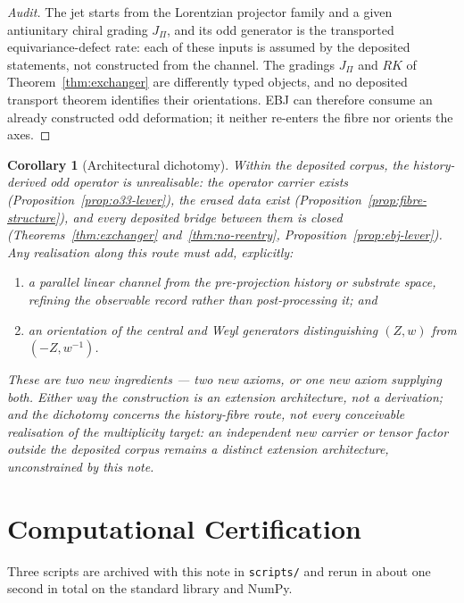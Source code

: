 \documentclass[11pt,a4paper]{article}
\newtheorem{corollary}[theorem]{Corollary}
\theoremstyle{definition}
\theoremstyle{remark}
\begin{document}
\begin{proof}[Audit]
  The jet starts from the Lorentzian projector family and a given antiunitary chiral
  grading $J_\Pi$, and its odd generator is the transported equivariance-defect rate:
  each of these inputs is assumed by the deposited statements, not constructed from the
  channel.
  The gradings $J_\Pi$ and $RK$ of Theorem~\ref{thm:exchanger} are differently typed
  objects, and no deposited transport theorem identifies their orientations.
  EBJ can therefore consume an already constructed odd deformation; it neither re-enters
  the fibre nor orients the axes.
\end{proof}

\begin{corollary}[Architectural dichotomy]
  \label{cor:dichotomy}
  Within the deposited corpus, the history-derived odd operator is unrealisable: the
  operator carrier exists (Proposition~\ref{prop:o33-lever}), the erased data exist
  (Proposition~\ref{prop:fibre-structure}), and every deposited bridge between them is
  closed (Theorems~\ref{thm:exchanger} and~\ref{thm:no-reentry},
  Proposition~\ref{prop:ebj-lever}).
  Any realisation along this route must add, explicitly:
  \begin{enumerate}[label=(\alph*)]
    \item a parallel linear channel from the pre-projection history or substrate space,
    refining the observable record rather than post-processing it; and
    \item an orientation of the central and Weyl generators distinguishing $(Z,w)$ from
    $(-Z,w^{-1})$.
  \end{enumerate}
  These are two new ingredients --- two new axioms, or one new axiom supplying both.
  Either way the construction is an extension architecture, not a derivation; and the
  dichotomy concerns the history-fibre route, not every conceivable realisation of the
  multiplicity target: an independent new carrier or tensor factor outside the deposited
  corpus remains a distinct extension architecture, unconstrained by this note.
\end{corollary}

\section{Computational Certification}
\label{sec:certification}

Three scripts are archived with this note in \texttt{scripts/} and rerun in about one
second in total on the standard library and NumPy.
\end{document}
